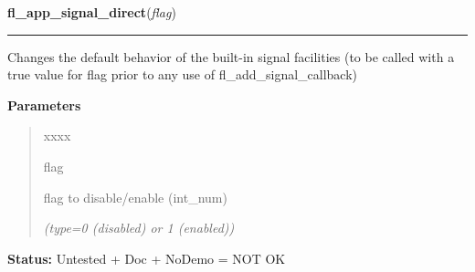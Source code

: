 \hspace{.8\funcindent}\begin{boxedminipage}{\funcwidth}

    \raggedright \textbf{fl\_app\_signal\_direct}(\textit{flag})

    \vspace{-1.5ex}

    \rule{\textwidth}{0.5\fboxrule}
\setlength{\parskip}{2ex}
    Changes the default behavior of the built-in signal facilities (to be 
    called with a true value for flag prior to any use of 
    fl\_add\_signal\_callback)

\setlength{\parskip}{1ex}
      \textbf{Parameters}
      \vspace{-1ex}

      \begin{quote}
        \begin{Ventry}{xxxx}

          \item[flag]

          flag to disable/enable (int\_num)

            {\it (type=0 (disabled) or 1 (enabled))}

        \end{Ventry}

      \end{quote}

\textbf{Status:} Untested + Doc + NoDemo = NOT OK



    \end{boxedminipage}

    \label{xformslib:library:fl_add_timeout}

    \vspace{0.5ex}

